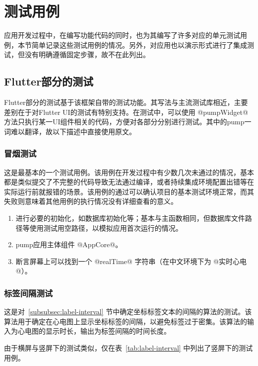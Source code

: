 \section{测试用例}\label{sec:test-case}

应用开发过程中，在编写功能代码的同时，也为其编写了许多对应的单元测试用例，本节简单记录这些测试用例的情况。另外，对应用也以演示形式进行了集成测试，但没有明确遵循固定步骤，故不在此列出。

\subsection{Flutter部分的测试}\label{subsec:test-flutter}

Flutter部分的测试基于该框架自带的测试功能。其写法与主流测试库相近，主要差别在于对Flutter UI的测试有特别支持。在测试中，可以使用 @pumpWidget@ 方法只执行某一UI组件相关的代码，方便对各部分分别进行测试。其中的pump一词难以翻译，故以下描述中直接使用原文。

\subsubsection{冒烟测试}

这是最基本的一个测试用例。该用例在开发过程中有少数几次未通过的情况，基本都是类似提交了不完整的代码导致无法通过编译，或者持续集成环境配置出错等在实际运行前就报错的场景。该用例的通过可以确认项目的基本测试环境正常，而其失败则意味着其他用例的执行情况没有详细查看的意义。

\begin{enumerate}
    \item 进行必要的初始化，如数据库初始化等；基本与主函数相同，但数据库文件路径等使用测试用空路径，以模拟应用首次运行的情况。
    \item pump应用主体组件 @AppCore@。
    \item 断言屏幕上可以找到一个 @realTime@ 字符串（在中文环境下为 @实时心电@）。
\end{enumerate}

\subsubsection{标签间隔测试}

这是对~\ref{subsubsec:label-interval} 节中确定坐标标签文本的间隔的算法的测试。该算法用于确定在心电图上显示坐标标签的间隔，以避免标签过于密集。该算法的输入为心电图的显示时长，输出为标签间隔的时间长度。

由于横屏与竖屏下的测试类似，仅在表~\ref{tab:label-interval} 中列出了竖屏下的测试用例。

